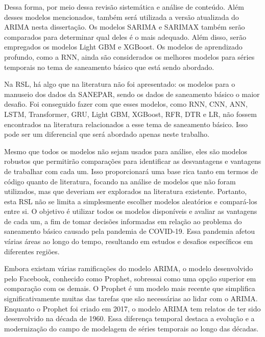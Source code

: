 Dessa forma, por meio dessa revisão sistemática e análise de conteúdo.
Além desses modelos mencionados, também será utilizada a versão atualizada do ARIMA nesta dissertação. Os modelos SARIMA e SARIMAX também serão comparados para determinar qual deles é o mais adequado. Além disso, serão empregados os modelos Light GBM e XGBoost. Os modelos de aprendizado profundo, como a RNN, ainda são considerados os melhores modelos para séries temporais no tema de saneamento básico que está sendo abordado.

Na RSL, há algo que na literatura não foi apresentado: os modelos para o manuseio dos dados da SANEPAR, sendo os dados de saneamento básico o maior desafio. Foi conseguido fazer com que esses modelos, como RNN, CNN, ANN, LSTM, Transformer, GRU, Light GBM, XGBoost, RFR, DTR e LR, não fossem encontrados na literatura relacionados a esse tema de saneamento básico. Isso pode ser um diferencial que será abordado apenas neste trabalho.

Mesmo que todos os modelos não sejam usados para análise, eles são modelos robustos que permitirão comparações para identificar as desvantagens e vantagens de trabalhar com cada um. Isso proporcionará uma base rica tanto em termos de código quanto de literatura, focando na análise de modelos que não foram utilizados, mas que deveriam ser explorados na literatura existente. Portanto, esta RSL não se limita a simplesmente escolher modelos aleatórios e compará-los entre si. O objetivo é utilizar todos os modelos disponíveis e avaliar as vantagens de cada um, a fim de tomar decisões informadas em relação ao problema do saneamento básico causado pela pandemia de COVID-19. Essa pandemia afetou várias áreas ao longo do tempo, resultando em estudos e desafios específicos em diferentes regiões.

Embora existam várias ramificações do modelo ARIMA, o modelo desenvolvido pelo Facebook, conhecido como Prophet, sobressai como uma opção superior em comparação com os demais. O Prophet é um modelo mais recente que simplifica significativamente muitas das tarefas que são necessárias ao lidar com o ARIMA. Enquanto o Prophet foi criado em 2017, o modelo ARIMA tem relatos de ter sido desenvolvido na década de 1960. Essa diferença temporal destaca a evolução e a modernização do campo de modelagem de séries temporais ao longo das décadas.











